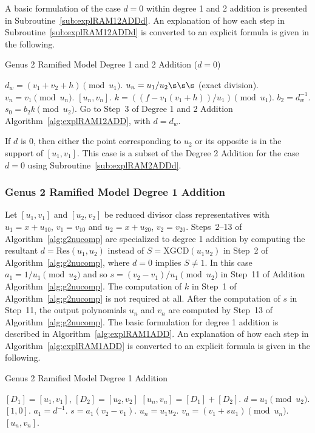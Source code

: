 A basic formulation of the case $d = 0$ within degree 1 and 2 addition is presented in
Subroutine~\ref{sub:explRAM12ADDd}. An explanation of how each step in
Subroutine~\ref{sub:explRAM12ADDd} is converted to an explicit formula is given in
the following. 

\begin{subroutine}[htbp]
\caption{Genus 2 Ramified Model Degree 1 and 2 Addition ($d = 0$)\label{sub:explRAM12ADDd}}
\begin{algorithmic} [1]
\State $d_w = (v_1 + v_2 + h) \pmod{u_1}$.
    \State $u_n = u_1/u_2 \s\s\s$ (exact division).
    \State $v_n = v_1 \pmod{u_n}.$
    \State \Return $[u_n,v_n]$.
\Else 
    \State $k = ((f - v_1(v_1 + h))/u_1) \pmod{u_1}$.
    \State $b_2 = d_w^{-1}$.
    \State $s_0 = b_2k \pmod{u_2}$.
    \State Go to Step~3 of Degree 1 and 2 Addition Algorithm~\ref{alg:explRAM12ADD}, with $d = d_w$.
\EndIf
\end{algorithmic}
\end{subroutine}

If $d$ is 0, then either the point corresponding to $u_2$ or its opposite is in
the support of $[u_1,v_1]$. This case is a subset of the Degree 2 Addition for
the case $d=0$ using Subroutine~\ref{sub:explRAM2ADDd}.


\subsubsection{Genus 2 Ramified Model Degree 1 Addition}
Let $[u_1,v_1]$ and $[u_2,v_2]$ be reduced divisor class representatives with
$u_1 = x + u_{10}$, $v_1 = v_{10}$ and $u_2 = x + u_{20}$, $v_2 = v_{20}$.
Steps~2--13 of Algorithm~\ref{alg:g2nucomp} are specialized to degree 1 addition by
computing the resultant $d = \mathrm{Res}(u_1,u_2)$ instead of $S =
\mathrm{XGCD}(u_1 u_2)$ in Step~2 of Algorithm~\ref{alg:g2nucomp}, where $d=0$
implies $S \neq 1$. In this case $a_1 = 1/u_1 \pmod{u_2}$ and so $s = (v_2 -
v_1)/u_1 \pmod{u_2}$ in Step~11 of Addition Algorithm~\ref{alg:g2nucomp}. The
computation of $k$ in Step~1 of Algorithm~\ref{alg:g2nucomp} is not required at
all. After the computation of $s$  in Step~11, the output polynomials $u_n$ and
$v_n$ are computed by Step~13 of Algorithm~\ref{alg:g2nucomp}. The basic
formulation for degree 1 addition is described in
Algorithm~\ref{alg:explRAM1ADD}. An explanation of how each step in
Algorithm~\ref{alg:explRAM1ADD} is converted to an explicit formula is given in
the following.

\begin{algorithm}[htbp]
\caption{Genus 2 Ramified Model Degree 1 Addition\label{alg:explRAM1ADD}}
\begin{algorithmic}[1] 
\Require $[D_1] = [u_1,v_1]$, $[D_2] = [u_2,v_2]$ \smallskip
\Ensure $[u_n,v_n] = [D_1] + [D_2] $.
\algrule
\State $d = u_1 \pmod{u_2}$.
 \Return $[1,0]$.
\EndIf
\State $a_1 = d^{-1}$.
\State $s = a_1(v_2 - v_1)$.
\State $u_n = u_1u_2$.
\State $v_n = (v_1 + su_1) \pmod{u_n}$.
\State \Return $[u_n,v_n]$.
\end{algorithmic}
\end{algorithm}

